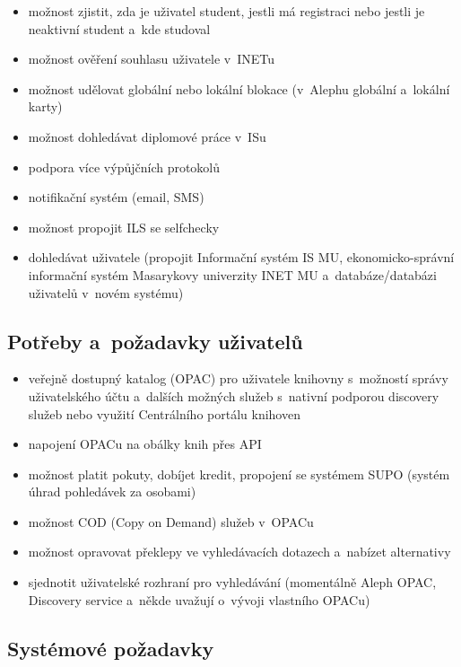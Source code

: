\documentclass[
	11pt, oneside, printed, final, palatino, monochrome
	microtype,
	table,   %
	lof,     %
	lot     %
]{fithesis3}
\begin{document}
{\begin{itemize}
\item možnost zjistit, zda je uživatel student, jestli má registraci nebo jestli je neaktivní student a~kde studoval
\item možnost ověření souhlasu uživatele v~INETu
\item možnost udělovat globální nebo lokální blokace (v~Alephu globální a~lokální karty)
\item možnost dohledávat diplomové práce v~ISu
\item podpora více výpůjčních protokolů
\item notifikační systém (email, SMS)
\item možnost propojit ILS se selfchecky
\item dohledávat uživatele (propojit Informační systém IS MU, ekonomicko-správní informační systém Masarykovy univerzity INET MU a~databáze/databázi uživatelů v~novém systému)
\end{itemize}

\subsection{Potřeby a~požadavky uživatelů}

\begin{itemize}
\item veřejně dostupný katalog (OPAC) pro uživatele knihovny s~možností správy uživatelského účtu a~dalších možných služeb s~nativní podporou discovery služeb nebo využití Centrálního portálu knihoven
\item napojení OPACu na obálky knih přes API 
\item možnost platit pokuty, dobíjet kredit, propojení se systémem SUPO (systém úhrad pohledávek za osobami)
\item možnost COD (Copy on Demand) služeb v~OPACu
\item možnost opravovat překlepy ve vyhledávacích dotazech a~nabízet alternativy
\item sjednotit uživatelské rozhraní pro vyhledávání (momentálně Aleph OPAC, Discovery service a~někde uvažují o~vývoji vlastního OPACu)
\end{itemize}

\subsection{Systémové požadavky}

}
\end{document}
